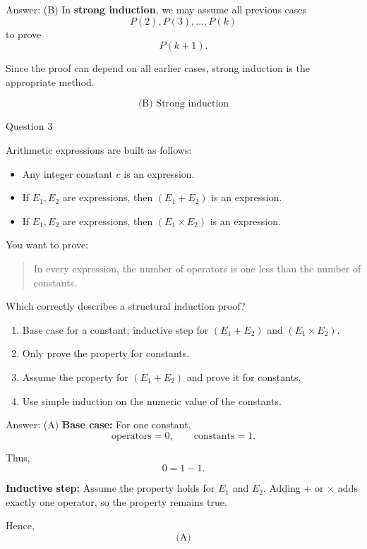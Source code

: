 \documentclass[aspectratio=169,11pt]{beamer}
\begin{document}
\begin{frame}

\begin{block}{Answer: (B)}
In \textbf{strong induction}, we may assume all previous cases
$$
P(2),P(3),\ldots,P(k)
$$
to prove
$$
P(k+1).
$$

Since the proof can depend on all earlier cases, strong induction
is the appropriate method.

$$
\boxed{\text{(B) Strong induction}}
$$
\end{block}

\end{frame}

\begin{frame}{Question 3}

Arithmetic expressions are built as follows:

\begin{itemize}
    \item Any integer constant $c$ is an expression.
    \item If $E_1,E_2$ are expressions, then $(E_1+E_2)$ is an expression.
    \item If $E_1,E_2$ are expressions, then $(E_1\times E_2)$ is an expression.
\end{itemize}

You want to prove:

\begin{quote}
In every expression, the number of operators is one less than
the number of constants.
\end{quote}

Which correctly describes a structural induction proof?

\begin{enumerate}
    \item[(A)] Base case for a constant; inductive step for
    $(E_1+E_2)$ and $(E_1\times E_2)$.
    \item[(B)] Only prove the property for constants.
    \item[(C)] Assume the property for $(E_1+E_2)$ and prove it for constants.
    \item[(D)] Use simple induction on the numeric value of the constants.
\end{enumerate}

\end{frame}

\begin{frame}

\begin{block}{Answer: (A)}
\textbf{Base case:} For one constant,
$$
\text{operators}=0,\qquad \text{constants}=1.
$$

Thus,
$$
0=1-1.
$$

\textbf{Inductive step:} Assume the property holds for $E_1$ and
$E_2$. Adding $+$ or $\times$ adds exactly one operator, so the
property remains true.

Hence,
$$
\boxed{\text{(A)}}
$$
\end{block}

\end{frame}
\end{document}
